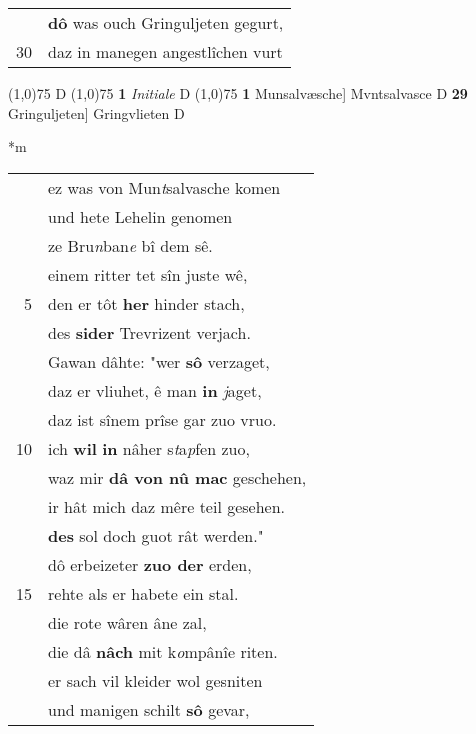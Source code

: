 \documentclass[8pt,a4paper,notitlepage]{article}
\begin{document}
\begin{table}[ht]
\begin{minipage}[t]{0.5\linewidth}
\begin{tabular}{rl}
 & \textbf{dô} was ouch Gringuljeten gegurt,\\ 
30 & daz in manegen angestlîchen vurt\\ 
\end{tabular}
\scriptsize
\line(1,0){75} \newline
D \newline
\line(1,0){75} \newline
\textbf{1} \textit{Initiale} D  \newline
\line(1,0){75} \newline
\textbf{1} Munsalvæsche] Mvntsalvasce D \textbf{29} Gringuljeten] Gringvlieten D \newline
\end{minipage}
\hspace{0.5cm}
\begin{minipage}[t]{0.5\linewidth}
\small
\begin{center}*m
\end{center}
\begin{tabular}{rl}
 & ez was von Mun\textit{t}salvasche komen\\ 
 & und hete Lehelin genomen\\ 
 & ze Bru\textit{n}ban\textit{e} bî dem sê.\\ 
 & einem ritter tet sîn juste wê,\\ 
5 & den er tôt \textbf{her} hinder stach,\\ 
 & des \textbf{sider} Trevrizent verjach.\\ 
 & Gawan dâhte: "wer \textbf{sô} verzaget,\\ 
 & daz er vliuhet, ê man \textbf{in} \textit{j}aget,\\ 
 & daz ist sînem prîse gar zuo vruo.\\ 
10 & ich \textbf{wil} \textbf{in} nâher s\textit{t}a\textit{p}fen zuo,\\ 
 & waz mir \textbf{dâ von nû mac} geschehen,\\ 
 & ir hât mich daz mêre teil gesehen.\\ 
 & \textbf{des} sol doch guot rât werden."\\ 
 & dô erbeizeter \textbf{zuo der} erden,\\ 
15 & rehte als er habete ein stal.\\ 
 & die rote wâren âne zal,\\ 
 & die dâ \textbf{nâch} mit k\textit{o}mpânîe riten.\\ 
 & er sach vil kleider wol gesniten\\ 
 & und manigen schilt \textbf{sô} gevar,\\ 

\end{tabular}
\end{minipage}
\end{table}
\end{document}
